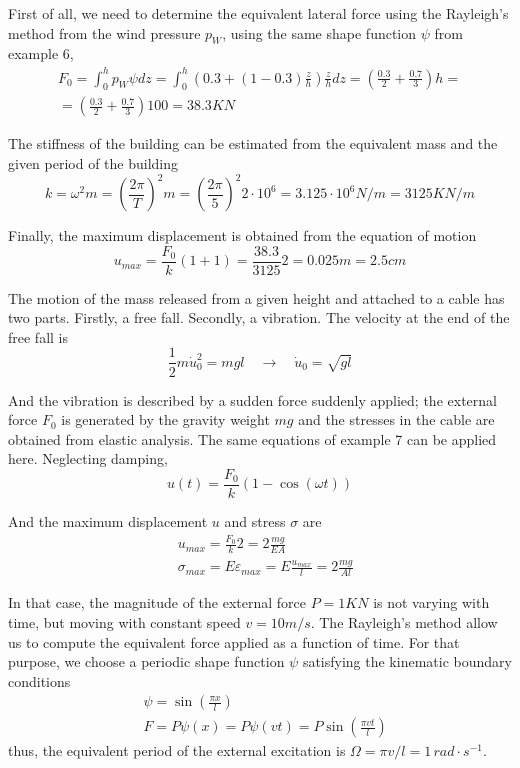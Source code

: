 First of all, we need to determine the equivalent lateral force using the Rayleigh's method from the wind pressure $p_W$, using the same shape function $\psi$ from example 6,
\begin{align*}
F_0 = \int_0^h p_W\psi dz = \int_0^h \left(0.3 + (1-0.3)\frac{z}{h}\right)\frac{z}{h}dz = \left(\frac{0.3}{2} + \frac{0.7}{3}\right)h = \\
= \left(\frac{0.3}{2} + \frac{0.7}{3}\right)100 = 38.3KN
\end{align*}

The stiffness of the building can be estimated from the equivalent mass and the given period of the building
$$
k = \omega^2m = \left(\frac{2\pi}{T}\right)^2m = \left(\frac{2\pi}{5}\right)^2 2\cdot 10^6 = 3.125\cdot 10^6 N/m = 3125KN/m
$$

Finally, the maximum displacement is obtained from the equation of motion
$$
u_{max} = \frac{F_0}{k}(1+1) = \frac{38.3}{3125}2 = 0.025m = 2.5cm
$$



The motion of the mass released from a given height and attached to a cable has two parts. Firstly, a free fall. Secondly, a vibration. The velocity at the end of the free fall is
$$
\frac{1}{2}m\dot{u}_0^2 = mgl \quad \rightarrow \quad \dot{u}_0 = \sqrt{gl}
$$

And the vibration is described by a sudden force suddenly applied; the external force $F_0$ is generated by the gravity weight $mg$ and the stresses in the cable are obtained from elastic analysis. The same equations of example 7 can be applied here. Neglecting damping,
$$
u(t) = \frac{F_0}{k}(1 -\cos(\omega t))
$$

And the maximum displacement $u$ and stress $\sigma$ are
\begin{align*}
&u_{max} = \frac{F_0}{k}2 = 2\frac{mg}{EA} \\
&\sigma_{max} = E\varepsilon_{max} = E\frac{u_{max}}{l} = 2\frac{mg}{Al}
\end{align*}



In that case, the magnitude of the external force $P=1KN$ is not varying with time, but moving with constant speed $v=10m/s$. The Rayleigh's method allow us to compute the equivalent force applied as a function of time. For that purpose, we choose a periodic shape function $\psi$ satisfying the kinematic boundary conditions
\begin{align*}
&\psi = \sin\left(\frac{\pi x}{l}\right) \\
&F = P\psi(x) = P\psi(vt) = P\sin\left(\frac{\pi vt}{l}\right)
\end{align*}
thus, the equivalent period of the external excitation is $\Omega = \pi v/l = 1\,rad\cdot s^{-1}$.

